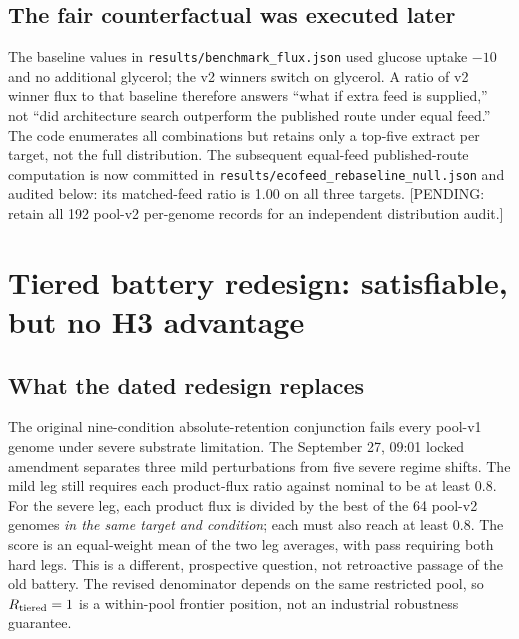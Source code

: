 \subsection{The fair counterfactual was executed later}
The baseline values in \texttt{results/benchmark\_flux.json} used glucose uptake $-10$ and no additional glycerol; the v2 winners switch on glycerol. A ratio of v2 winner flux to that baseline therefore answers ``what if extra feed is supplied,'' not ``did architecture search outperform the published route under equal feed.'' The code enumerates all combinations but retains only a top-five extract per target, not the full distribution. The subsequent equal-feed published-route computation is now committed in \texttt{results/ecofeed\_rebaseline\_null.json} and audited below: its matched-feed ratio is 1.00 on all three targets. [PENDING: retain all 192 pool-v2 per-genome records for an independent distribution audit.]

\section{Tiered battery redesign: satisfiable, but no H3 advantage}
\subsection{What the dated redesign replaces}
The original nine-condition absolute-retention conjunction fails every pool-v1 genome under severe substrate limitation. The September 27, 09:01 locked amendment separates three mild perturbations from five severe regime shifts. The mild leg still requires each product-flux ratio against nominal to be at least 0.8. For the severe leg, each product flux is divided by the best of the 64 pool-v2 genomes \emph{in the same target and condition}; each must also reach at least 0.8. The score is an equal-weight mean of the two leg averages, with pass requiring both hard legs. This is a different, prospective question, not retroactive passage of the old battery. The revised denominator depends on the same restricted pool, so $R_{\rm tiered}=1$ is a within-pool frontier position, not an industrial robustness guarantee.

